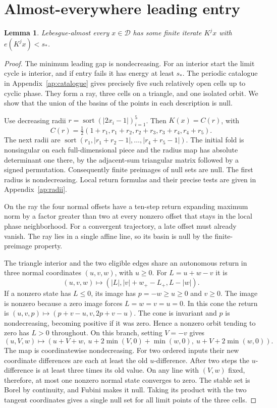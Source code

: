 \documentclass[11pt,reqno]{amsart}
\newtheorem{lemma}[theorem]{Lemma}
\theoremstyle{remark}
\newcommand{\sort}{\operatorname{sort}}
\begin{document}
\section{Almost-everywhere leading entry}\label{sec:leading-entry}

\begin{lemma}\label{lem:entry}
Lebesgue-almost every \(x\in\mathcal D\) has some finite iterate \(K^j x\) with \(e(K^jx)<s_*\).
\end{lemma}
\begin{proof}
The minimum leading gap is nondecreasing. For an interior start the limit cycle is interior, and if entry fails it has energy at least \(s_*\). The periodic catalogue in Appendix~\ref{ap:catalogue} gives precisely five such relatively open cells up to cyclic phase. They form a ray, three cells on a triangle, and one isolated orbit. We show that the union of the basins of the points in each description is null.

Use decreasing radii \(r=\sort(|2x_i-1|)_{i=1}^5\). Then \(K(x)=C(r)\), with
\[
 C(r)=\tfrac12(1+r_1,r_1+r_2,r_2+r_3,r_3+r_4,r_4+r_5).
\]
The next radii are \(\sort(r_1,|r_1+r_2-1|,\ldots,|r_4+r_5-1|)\). The initial fold is nonsingular on each full-dimensional piece and the radius map has absolute determinant one there, by the adjacent-sum triangular matrix followed by a signed permutation. Consequently finite preimages of null sets are null. The first radius is nondecreasing. Local return formulas and their precise tests are given in Appendix~\ref{ap:radii}.

On the ray the four normal offsets have a ten-step return expanding maximum norm by a factor greater than two at every nonzero offset that stays in the local phase neighborhood. For a convergent trajectory, a late offset must already vanish. The ray lies in a single affine line, so its basin is null by the finite-preimage property.

The triangle interior and the two eligible edges share an autonomous return in three normal coordinates \((u,v,w)\), with \(u\ge0\). For \(L=u+w-v\) it is
\[
 (u,v,w)\longmapsto (|L|,|v|+w_+-L_+,L-|w|).
\]
If a nonzero state has \(L\le0\), its image has \(p=-w\ge u\ge0\) and \(v\ge0\). The image is nonzero because a zero image forces \(L=w=v=u=0\). In this cone the return is \((u,v,p)\mapsto(p+v-u,v,2p+v-u)\). The cone is invariant and \(p\) is nondecreasing, becoming positive if it was zero. Hence a nonzero orbit tending to zero has \(L>0\) throughout. On this branch, setting \(V=-v\) gives
\[
 (u,V,w)\longmapsto
 (u+V+w,\ u+2\min(V,0)+\min(w,0),\ u+V+2\min(w,0)).
\]
The map is coordinatewise nondecreasing. For two ordered inputs their new coordinate differences are each at least the old \(u\)-difference. After two steps the \(u\)-difference is at least three times its old value. On any line with \((V,w)\) fixed, therefore, at most one nonzero normal state converges to zero. The stable set is Borel by continuity, and Fubini makes it null. Taking its product with the two tangent coordinates gives a single null set for all limit points of the three cells.


\end{proof}
\end{document}
